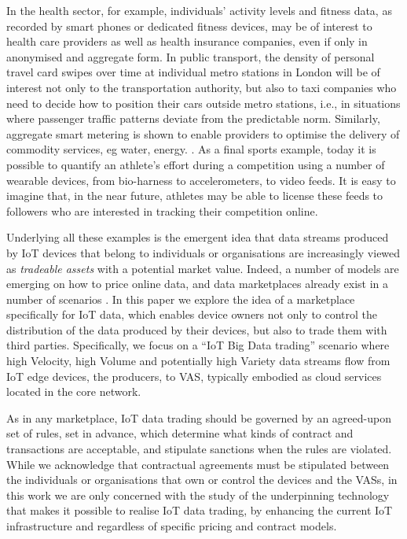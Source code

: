 \documentclass[conference]{IEEEtran}
\begin{document}
In the health sector, for example, individuals' activity levels and fitness data, as recorded by smart phones or dedicated fitness devices, may be of interest to health care providers as well as health insurance companies, even if only in anonymised and aggregate form.
%
In public transport, the density of personal travel card swipes over time at individual metro stations in London will be of interest not only to the transportation authority, but also to taxi companies who need to decide how to position their cars outside metro stations, i.e., in situations where passenger traffic patterns deviate from the predictable norm.
%
 Similarly, aggregate smart metering is shown to enable providers to optimise the delivery of commodity services, eg water, energy.  .
%
As a final sports example, today it is possible to quantify an athlete's effort during a competition using a number of wearable devices, from bio-harness to accelerometers, to video feeds. 
It is easy to imagine that, in the near future, athletes may be able to license these feeds to followers who are interested in tracking their competition online.

Underlying all these examples is the emergent idea that data streams produced by IoT devices that belong to individuals or organisations are increasingly viewed as \textit{tradeable assets} with a potential market value.
%
Indeed,  a number of models are emerging on how to price online data, and data marketplaces already exist in a number of scenarios .
%
In this paper we explore the idea of a marketplace specifically for IoT data, which enables device owners not only to control the distribution of the data produced by their devices, but also to trade them with third parties.
%
Specifically, we focus on a ``IoT Big Data trading'' scenario where high Velocity, high Volume and potentially high Variety data streams flow from IoT edge devices, the producers, to VAS, typically embodied as cloud services located in the core network.

As in any marketplace, IoT data trading should be governed by an agreed-upon set of rules, set in advance, which determine what kinds of contract and transactions are acceptable, and stipulate sanctions when the rules are violated.
%
While we acknowledge that contractual agreements must be stipulated between the individuals or organisations that own or control the devices and the VASs, in this work we are only concerned with the study of the underpinning technology that makes it possible to realise IoT data trading, by enhancing the current IoT infrastructure and regardless of specific pricing and contract models.
\end{document}
